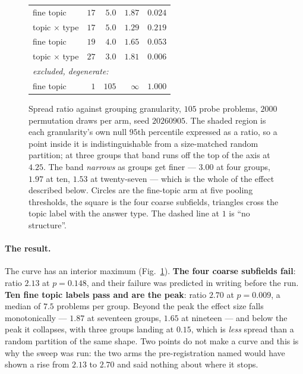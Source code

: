 \begin{figure}[t]
\begin{minipage}{0.405\textwidth}
\begin{tabular}{lrrrr}
fine topic          & $17$ & $5.0$  & $1.87$ & $0.024$ \\
topic $\times$ type & $17$ & $5.0$  & $1.29$ & $0.219$ \\
fine topic          & $19$ & $4.0$  & $1.65$ & $0.053$ \\
topic $\times$ type & $27$ & $3.0$  & $1.81$ & $\mathbf{0.006}$ \\
\midrule
\multicolumn{5}{l}{\emph{excluded, degenerate:}} \\
fine topic          & $1$  & $105$  & $\infty$ & $1.000$ \\
\bottomrule
\end{tabular}
\end{minipage}
\caption{Spread ratio against grouping granularity, $105$ probe problems, $2000$ permutation
draws per arm, seed $20260905$. The shaded region is each granularity's own null $95$th
percentile expressed as a ratio, so a point inside it is indistinguishable from a size-matched
random partition; at three groups that band runs off the top of the axis at $4.25$. The band
\emph{narrows} as groups get finer --- $3.00$ at four groups, $1.97$ at ten, $1.53$ at
twenty-seven --- which is the whole of the effect described below. Circles are the fine-topic
arm at five pooling thresholds, the square is the four coarse subfields, triangles cross the
topic label with the answer type. The dashed line at $1$ is ``no structure''.}
\label{fig:granularity}
\end{figure}

\paragraph{The result.} The curve has an interior maximum
(Fig.~\ref{fig:granularity}). \textbf{The four coarse subfields fail}: ratio $2.13$ at
$p=0.148$, and their failure was predicted in writing before the run. \textbf{Ten fine topic
labels pass and are the peak}: ratio $2.70$ at $p=0.009$, a median of $7.5$ problems per group.
Beyond the peak the effect size falls monotonically --- $1.87$ at seventeen groups, $1.65$ at
nineteen --- and below the peak it collapses, with three groups landing at $0.15$, which is
\emph{less} spread than a random partition of the same shape. Two points do not make a curve
and this is why the sweep was run: the two arms the pre-registration named would have shown a
rise from $2.13$ to $2.70$ and said nothing about where it stops.

